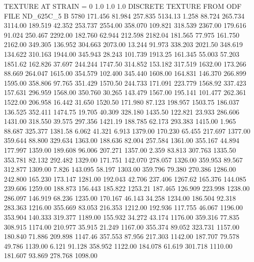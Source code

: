 TEXTURE AT STRAIN = 0
1.0   1.0   1.0
DISCRETE TEXTURE FROM ODF FILE ND_625C_5
B 5780
 171.456   81.984  257.835      5134.13
   1.258   88.724  265.734      3114.00
 189.519   42.352  253.737      2554.00
 358.070  109.821  318.539      2367.00
 179.616   91.024  250.467      2292.00
 182.760   62.944  212.598      2182.04
 181.565   77.975  161.750      2162.00
 349.305  136.952  304.663      2073.00
  13.244   91.973  338.203      2021.50
 348.619  134.622  310.163      1944.00
 345.943   28.243  101.739      1913.25
 161.345   55.003   57.203      1851.62
 162.826   37.697  244.244      1747.50
 314.852  153.182  317.519      1632.00
 173.266   88.669  264.047      1615.00
 354.579  102.400  345.440      1608.00
 164.831  146.370  266.899      1595.00
 358.806   97.765  351.429      1570.50
 244.733  171.091  223.779      1568.92
 337.423  157.631  296.959      1568.00
 350.760   30.265  143.479      1567.00
 195.141  101.477  262.361      1522.00
 206.958   16.442   31.650      1520.50
 171.980   87.123  198.957      1503.75
 186.037  136.525  352.411      1474.75
  19.705   40.309  328.180      1435.50
 122.821   23.933  286.606      1431.00
 318.550   39.575  297.356      1421.19
 188.785   62.173  293.383      1415.00
   1.965   88.687  325.377      1381.58
   6.062   41.321    6.913      1379.00
 170.230   65.455  217.697      1377.00
 359.644   88.800  329.634      1363.00
 188.636   82.004  257.584      1361.00
 355.167   44.894  177.997      1359.00
 189.608   96.006  207.271      1357.00
   2.359   83.813  307.763      1335.50
 353.781   82.132  292.482      1329.00
 171.751  142.070  278.057      1326.00
 359.953   89.567  312.877      1309.00
   7.826  143.095   58.197      1303.00
 359.796   79.380  270.386      1286.00
 242.800  165.230  173.147      1281.00
 192.043   42.706  237.406      1267.62
 165.376  144.085  239.606      1259.00
 188.873  156.443  185.822      1253.21
 187.465  126.909  223.998      1238.00
 286.097  146.919   68.236      1235.00
 170.167   46.143   34.258      1234.00
 186.504   92.318  283.363      1216.00
 355.669   83.053  216.353      1212.00
 192.936  117.755   46.067      1196.00
 353.904  140.333  319.377      1189.00
 155.932   34.272   43.174      1176.00
 359.316   77.835  308.915      1174.00
 210.977   35.915   21.249      1167.00
 355.374   89.052  323.731      1157.00
 180.840   71.886  209.898      1147.46
 357.553   87.956  217.303      1142.00
 187.707   79.578   49.786      1139.00
   6.121   91.128  358.952      1122.00
 184.078   61.619  301.718      1110.00
 181.607   93.869  278.768      1098.00
